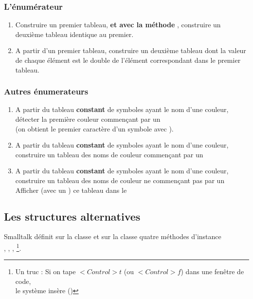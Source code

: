 \subsubsection{L'\'enum\'erateur }
 
\begin{enumerate}
\item
Construire un premier tableau, {\bf et avec la m\'ethode },
construire un deuxi\`eme tableau identique au premier.
\item
A partir d'un premier tableau, construire un deuxi\`eme tableau dont la valeur
de chaque \'el\'ement est le double de l'\'el\'ement correspondant dans le
premier tableau.
\end{enumerate}

\subsubsection{Autres \'enumerateurs}
\begin{enumerate}
\item
A partir du tableau {\bf constant} de symboles  ayant le nom
d'une couleur, d\'etecter la premi\`ere couleur
commen\c{c}ant par un \\
(on obtient le premier caract\`ere d'un symbole avec ).
\item
A partir du tableau {\bf constant} de symboles  ayant le nom
d'une couleur, construire un tableau des noms de couleur
commen\c{c}ant par un 
\item
A partir du tableau {\bf constant} de symboles  ayant le nom
d'une couleur, construire un tableau des noms de couleur
ne commen\c{c}ant pas par un \\
Afficher (avec un ) ce tableau dans le 
\end{enumerate}

\subsection{Les structures alternatives}

Smalltalk d\'efinit sur la classe  et sur la classe 
quatre m\'ethodes d'instance\\
, , , 
\footnote{Un truc : Si on tape $<Control>t$ (ou $<Control>f$) dans une
 fen\^etre de code,\\le syst\`eme ins\`ere  ()}.

